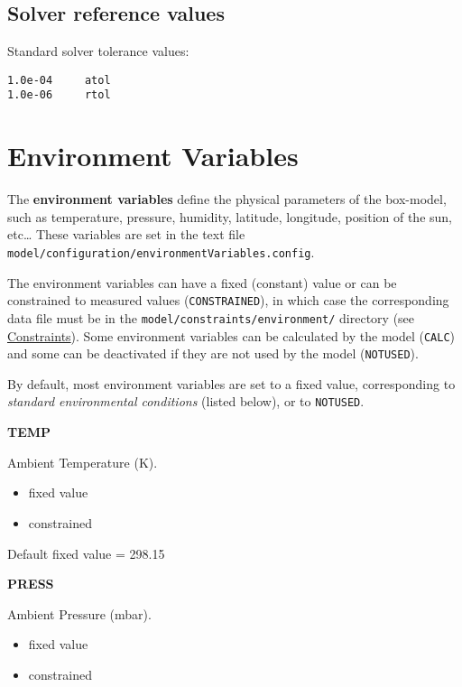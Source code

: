 \subsection{Solver reference
  values} \label{subsec:solver-reference-values}

Standard solver tolerance values:

\begin{verbatim}
1.0e-04     atol
1.0e-06     rtol
\end{verbatim}

\section{Environment Variables} \label{sec:envvar}

The \textbf{environment variables} define the physical parameters of
the box-model, such as temperature, pressure, humidity, latitude,
longitude, position of the sun, etc\ldots{} These variables are set in
the text file
\texttt{model/configuration/environmentVariables.config}.

The environment variables can have a fixed (constant) value or can be
constrained to measured values (\texttt{CONSTRAINED}), in which case
the corresponding data file must be in the
\texttt{model/constraints/environment/} directory (see
\hyperref[sec:constraints]{Constraints}). Some environment variables
can be calculated by the model (\texttt{CALC}) and some can be
deactivated if they are not used by the model (\texttt{NOTUSED}).

By default, most environment variables are set to a fixed value,
corresponding to \emph{standard environmental conditions} (listed
below), or to \texttt{NOTUSED}.

\textbf{TEMP}

Ambient Temperature (K).

\begin{itemize}
\item fixed value
\item constrained
\end{itemize}

Default fixed value = 298.15

\textbf{PRESS}

Ambient Pressure (mbar).

\begin{itemize}
\item fixed value
\item constrained
\end{itemize}

